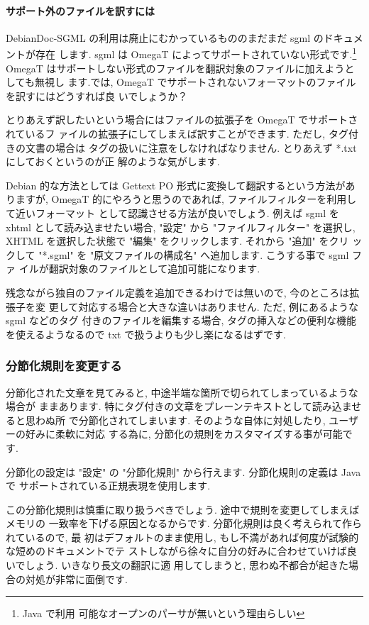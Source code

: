 \documentclass[mingoth,a4paper]{jsarticle}
\begin{document}
\paragraph{サポート外のファイルを訳すには}
DebianDoc-SGML の利用は廃止にむかっているもののまだまだ sgml のドキュメントが存在
します. sgml は OmegaT によってサポートされていない形式です.\footnote{Java で利用
可能なオープンのパーサが無いという理由らしい}
OmegaT はサポートしない形式のファイルを翻訳対象のファイルに加えようとしても無視し
ます.では, OmegaT でサポートされないフォーマットのファイルを訳すにはどうすれば良
いでしょうか？

とりあえず訳したいという場合にはファイルの拡張子を OmegaT でサポートされているフ
ァイルの拡張子にしてしまえば訳すことができます. ただし, タグ付きの文書の場合は 
タグの扱いに注意をしなければなりません. とりあえず *.txt にしておくというのが正
解のような気がします.

Debian 的な方法としては Gettext PO 形式に変換して翻訳するという方法がありますが,
 OmegaT 的にやろうと思うのであれば, ファイルフィルターを利用して近いフォーマット
として認識させる方法が良いでしょう.
例えば sgml を xhtml として読み込ませたい場合, "設定" から "ファイルフィルター" 
を選択し, XHTML を選択した状態で "編集" をクリックします. それから "追加" をクリ
ックして "*.sgml" を "原文ファイルの構成名" へ追加します. こうする事で sgml ファ
イルが翻訳対象のファイルとして追加可能になります.

残念ながら独自のファイル定義を追加できるわけでは無いので, 今のところは拡張子を変
更して対応する場合と大きな違いはありません. ただ, 例にあるような sgml などのタグ
付きのファイルを編集する場合, タグの挿入などの便利な機能を使えるようなるので txt
 で扱うよりも少し楽になるはずです.

\subsubsection{分節化規則を変更する}
分節化された文章を見てみると, 中途半端な箇所で切られてしまっているような場合が
ままあります. 特にタグ付きの文章をプレーンテキストとして読み込ませると思わぬ所
で分節化されてしまいます. そのような自体に対処したり, ユーザーの好みに柔軟に対応
する為に, 分節化の規則をカスタマイズする事が可能です.

分節化の設定は "設定" の "分節化規則" から行えます. 分節化規則の定義は Java で
サポートされている正規表現を使用します. 

この分節化規則は慎重に取り扱うべきでしょう. 途中で規則を変更してしまえばメモリの
一致率を下げる原因となるからです. 分節化規則は良く考えられて作られているので, 最
初はデフォルトのまま使用し, もし不満があれば何度が試験的な短めのドキュメントでテ
ストしながら徐々に自分の好みに合わせていけば良いでしょう. いきなり長文の翻訳に適
用してしまうと, 思わぬ不都合が起きた場合の対処が非常に面倒です.
\end{document}
